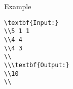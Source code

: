 Example
\begin{verbatim}
\textbf{Input:}
\\5 1 1
\\4 4
\\4 3
\\
\\\textbf{Output:}
\\10
\\\end{verbatim}